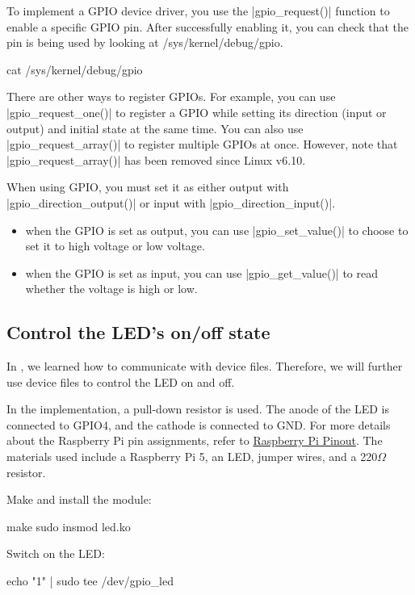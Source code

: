 \documentclass[10pt, oneside]{book}
\begin{document}
To implement a GPIO device driver, you use the \cpp|gpio_request()| function to enable a specific GPIO pin.
After successfully enabling it, you can check that the pin is being used by looking at /sys/kernel/debug/gpio.

\begin{codebash}
cat /sys/kernel/debug/gpio
\end{codebash}

There are other ways to register GPIOs.
For example, you can use \cpp|gpio_request_one()| to register a GPIO while setting its direction (input or output) and initial state at the same time.
You can also use \cpp|gpio_request_array()| to register multiple GPIOs at once. However, note that \cpp|gpio_request_array()| has been removed since Linux v6.10.

When using GPIO, you must set it as either output with \cpp|gpio_direction_output()| or input with \cpp|gpio_direction_input()|.

\begin{itemize}
  \item when the GPIO is set as output, you can use \cpp|gpio_set_value()| to choose to set it to high voltage or low voltage.
  \item when the GPIO is set as input, you can use \cpp|gpio_get_value()| to read whether the voltage is high or low.
\end{itemize}

\subsection{Control the LED's on/off state}
\label{sec:gpio_led}
In , we learned how to communicate with device files.
Therefore, we will further use device files to control the LED on and off.

In the implementation, a pull-down resistor is used.
The anode of the LED is connected to GPIO4, and the cathode is connected to GND.
For more details about the Raspberry Pi pin assignments, refer to \href{https://pinout.xyz/}{Raspberry Pi Pinout}.
The materials used include a Raspberry Pi 5, an LED, jumper wires, and a 220$\Omega$ resistor.


Make and install the module:
\begin{codebash}
make
sudo insmod led.ko
\end{codebash}

Switch on the LED:
\begin{codebash}
echo "1" | sudo tee /dev/gpio_led
\end{codebash}
\end{document}
